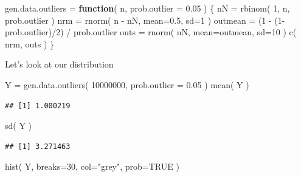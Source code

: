 \documentclass[
]{book}
\newenvironment{Shaded}{\begin{snugshade}}{\end{snugshade}}
\newcommand{\AttributeTok}[1]{\textcolor[rgb]{0.77,0.63,0.00}{#1}}
\newcommand{\ConstantTok}[1]{\textcolor[rgb]{0.00,0.00,0.00}{#1}}
\newcommand{\ControlFlowTok}[1]{\textcolor[rgb]{0.13,0.29,0.53}{\textbf{#1}}}
\newcommand{\DecValTok}[1]{\textcolor[rgb]{0.00,0.00,0.81}{#1}}
\newcommand{\FloatTok}[1]{\textcolor[rgb]{0.00,0.00,0.81}{#1}}
\newcommand{\FunctionTok}[1]{\textcolor[rgb]{0.00,0.00,0.00}{#1}}
\newcommand{\NormalTok}[1]{#1}
\newcommand{\OtherTok}[1]{\textcolor[rgb]{0.56,0.35,0.01}{#1}}
\newcommand{\SpecialCharTok}[1]{\textcolor[rgb]{0.00,0.00,0.00}{#1}}
\newcommand{\StringTok}[1]{\textcolor[rgb]{0.31,0.60,0.02}{#1}}
\begin{document}
\begin{Shaded}
\begin{Highlighting}[]
\NormalTok{gen.data.outliers }\OtherTok{=} \ControlFlowTok{function}\NormalTok{( n, }\AttributeTok{prob.outlier =} \FloatTok{0.05}\NormalTok{ ) \{}
\NormalTok{    nN }\OtherTok{=} \FunctionTok{rbinom}\NormalTok{( }\DecValTok{1}\NormalTok{, n, prob.outlier )}
\NormalTok{    nrm }\OtherTok{=} \FunctionTok{rnorm}\NormalTok{( n }\SpecialCharTok{{-}}\NormalTok{ nN, }\AttributeTok{mean=}\FloatTok{0.5}\NormalTok{, }\AttributeTok{sd=}\DecValTok{1}\NormalTok{ )}
\NormalTok{    outmean }\OtherTok{=}\NormalTok{ (}\DecValTok{1} \SpecialCharTok{{-}}\NormalTok{ (}\DecValTok{1}\SpecialCharTok{{-}}\NormalTok{prob.outlier)}\SpecialCharTok{/}\DecValTok{2}\NormalTok{) }\SpecialCharTok{/}\NormalTok{ prob.outlier}
\NormalTok{    outs }\OtherTok{=} \FunctionTok{rnorm}\NormalTok{( nN, }\AttributeTok{mean=}\NormalTok{outmean, }\AttributeTok{sd=}\DecValTok{10}\NormalTok{ )}
    \FunctionTok{c}\NormalTok{( nrm, outs )}
\NormalTok{\}}
\end{Highlighting}
\end{Shaded}

Let's look at our distribution

\begin{Shaded}
\begin{Highlighting}[]
\NormalTok{Y }\OtherTok{=} \FunctionTok{gen.data.outliers}\NormalTok{( }\DecValTok{10000000}\NormalTok{, }\AttributeTok{prob.outlier =} \FloatTok{0.05}\NormalTok{ )}
\FunctionTok{mean}\NormalTok{( Y )}
\end{Highlighting}
\end{Shaded}

\begin{verbatim}
## [1] 1.000219
\end{verbatim}

\begin{Shaded}
\begin{Highlighting}[]
\FunctionTok{sd}\NormalTok{( Y )}
\end{Highlighting}
\end{Shaded}

\begin{verbatim}
## [1] 3.271463
\end{verbatim}

\begin{Shaded}
\begin{Highlighting}[]
\FunctionTok{hist}\NormalTok{( Y, }\AttributeTok{breaks=}\DecValTok{30}\NormalTok{, }\AttributeTok{col=}\StringTok{"grey"}\NormalTok{, }\AttributeTok{prob=}\ConstantTok{TRUE}\NormalTok{ )}
\end{Highlighting}
\end{Shaded}
\end{document}
